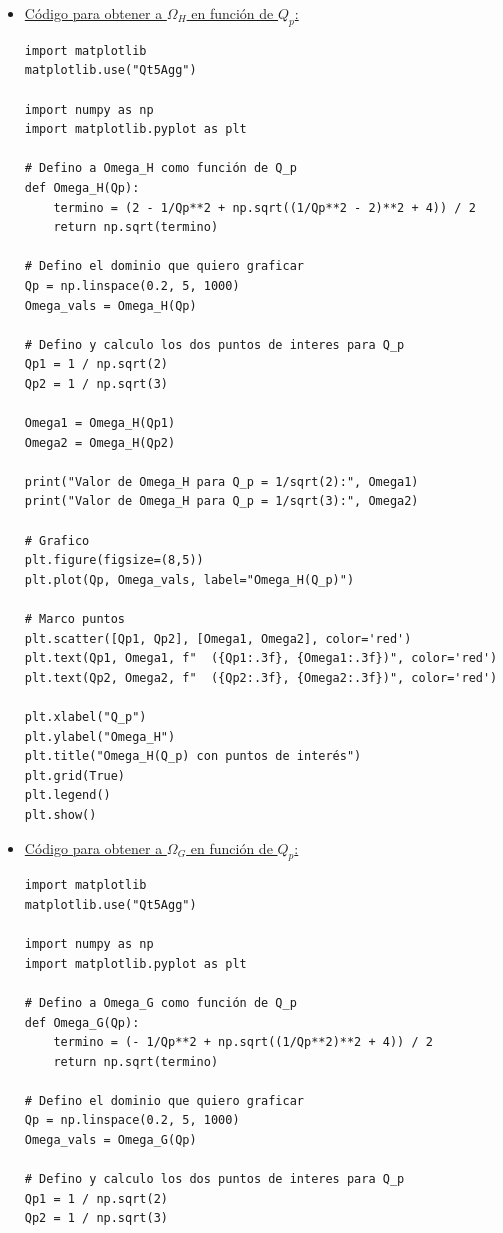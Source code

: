 \documentclass[12pt,a4paper]{article}
\begin{document}
\begin{itemize}
    \item \underline{Código para obtener a $\Omega_H$ en función de $Q_p$:}
\begin{verbatim}
import matplotlib
matplotlib.use("Qt5Agg")
    
import numpy as np
import matplotlib.pyplot as plt
    
# Defino a Omega_H como función de Q_p
def Omega_H(Qp):
    termino = (2 - 1/Qp**2 + np.sqrt((1/Qp**2 - 2)**2 + 4)) / 2
    return np.sqrt(termino)
    
# Defino el dominio que quiero graficar
Qp = np.linspace(0.2, 5, 1000)
Omega_vals = Omega_H(Qp)
    
# Defino y calculo los dos puntos de interes para Q_p
Qp1 = 1 / np.sqrt(2)
Qp2 = 1 / np.sqrt(3)
    
Omega1 = Omega_H(Qp1)
Omega2 = Omega_H(Qp2)
    
print("Valor de Omega_H para Q_p = 1/sqrt(2):", Omega1)
print("Valor de Omega_H para Q_p = 1/sqrt(3):", Omega2)
    
# Grafico
plt.figure(figsize=(8,5))
plt.plot(Qp, Omega_vals, label="Omega_H(Q_p)")
    
# Marco puntos
plt.scatter([Qp1, Qp2], [Omega1, Omega2], color='red')
plt.text(Qp1, Omega1, f"  ({Qp1:.3f}, {Omega1:.3f})", color='red')
plt.text(Qp2, Omega2, f"  ({Qp2:.3f}, {Omega2:.3f})", color='red')
    
plt.xlabel("Q_p")
plt.ylabel("Omega_H")
plt.title("Omega_H(Q_p) con puntos de interés")
plt.grid(True)
plt.legend()
plt.show()
\end{verbatim}


    \item \underline{Código para obtener a $\Omega_G$ en función de $Q_p$:}
\begin{verbatim}
import matplotlib
matplotlib.use("Qt5Agg")
        
import numpy as np
import matplotlib.pyplot as plt
        
# Defino a Omega_G como función de Q_p
def Omega_G(Qp):
    termino = (- 1/Qp**2 + np.sqrt((1/Qp**2)**2 + 4)) / 2
    return np.sqrt(termino)
        
# Defino el dominio que quiero graficar
Qp = np.linspace(0.2, 5, 1000)
Omega_vals = Omega_G(Qp)
        
# Defino y calculo los dos puntos de interes para Q_p
Qp1 = 1 / np.sqrt(2)
Qp2 = 1 / np.sqrt(3)
        

\end{verbatim}
\end{itemize}
\end{document}
